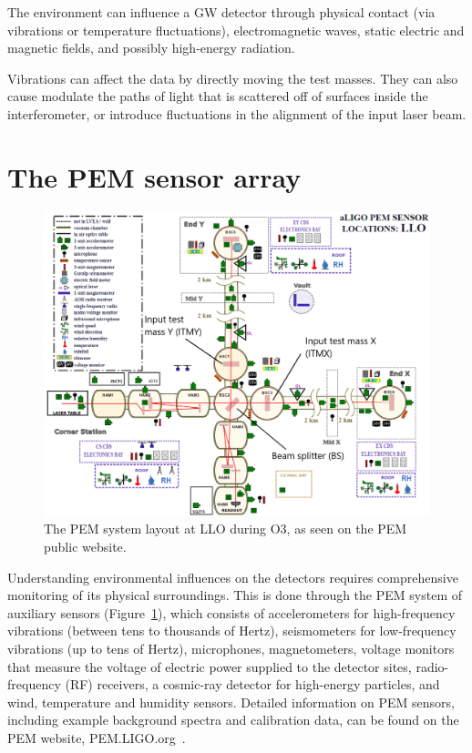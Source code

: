 The environment can influence a \ac{GW} detector through physical contact (via vibrations or temperature fluctuations), electromagnetic waves, static electric and magnetic fields, and possibly high-energy radiation.

Vibrations can affect the data by directly moving the test masses.
They can also cause modulate the paths of light that is scattered off of surfaces inside the interferometer, or introduce fluctuations in the alignment of the input laser beam.

\section{The PEM sensor array}

\begin{figure}[h!]
	\centering
	\includegraphics[width=\textwidth]{figures/channels.png}
	\caption{
		The PEM system layout at LLO during O3, as seen on the PEM public website.}
	\label{fig:channels}
\end{figure}

Understanding environmental influences on the detectors requires comprehensive monitoring of its physical surroundings.
This is done through the \ac{PEM} system of auxiliary sensors (Figure~\ref{fig:channels}), which consists of accelerometers for high-frequency vibrations (between tens to thousands of Hertz), seismometers for low-frequency vibrations (up to tens of Hertz), microphones, magnetometers, voltage monitors that measure the voltage of electric power supplied to the detector sites, radio-frequency (RF) receivers, a cosmic-ray detector for high-energy particles, and wind, temperature and humidity sensors.
Detailed information on \ac{PEM} sensors, including example background spectra and calibration data, can be found on the \ac{PEM} website, PEM.LIGO.org~\citep{PEM_website}.

